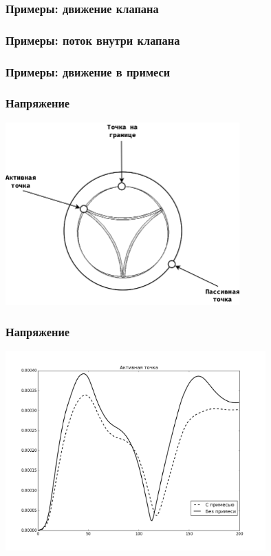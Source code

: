 \documentclass[14pt]{beamer}
\begin{document}
\begin{frame}
\frametitle{Примеры: движение клапана}
\end{frame}

\begin{frame}
\frametitle{Примеры: поток внутри клапана}
\end{frame}

\begin{frame}
\frametitle{Примеры: движение в примеси}
\end{frame}

\begin{frame}
\frametitle{Напряжение}
    \begin{center}
        \includegraphics[width=9cm]{valve_points.png}
    \end{center}
\end{frame}

\begin{frame}
\frametitle{Напряжение}
    \begin{center}
        \includegraphics[width=10cm]{forces_active_point.png}
    \end{center}
\end{frame}
\end{document}
